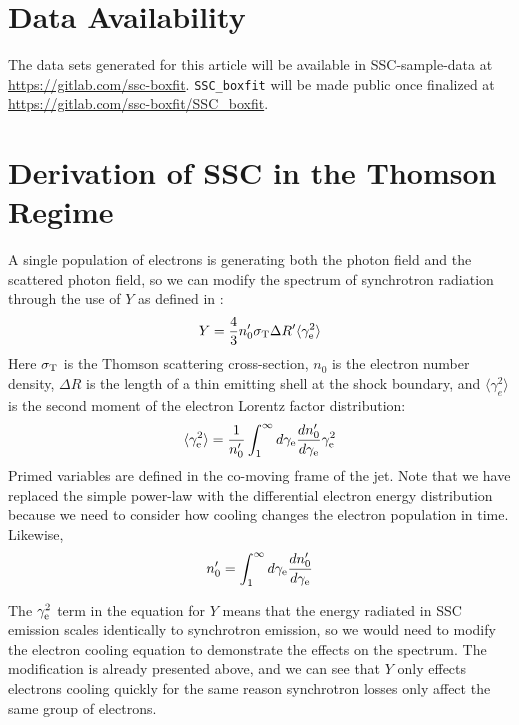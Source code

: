 \documentclass[fleqn,usenatbib]{mnras}
\begin{document}
\section*{Data Availability}

The data sets generated for this article will be available in SSC-sample-data at \url{https://gitlab.com/ssc-boxfit}. \texttt{SSC\_boxfit} will be made public once finalized at \url{https://gitlab.com/ssc-boxfit/SSC_boxfit}.



\onecolumn
\appendix

\section{Derivation of SSC in the Thomson Regime}\label{appT}

A single population of electrons is generating both the photon field and the scattered photon field, so we can modify the spectrum of synchrotron radiation through the use of $Y$ as defined in \citet{RL}:
\begin{equation}
\label{Y:gammal}
Y = \frac{4}{3}n_0^{\prime} \sigma_{\rm T} \Delta R^{\prime} \langle\gamma_{\rm e}^2\rangle
\end{equation}
Here $\sigma_{\rm T}$ is the Thomson scattering cross-section, $n_0$ is the electron number density, $\Delta R$ is the length of a thin emitting shell at the shock boundary, and $\langle \gamma_{e}^2\rangle$ is the second moment of the electron Lorentz factor distribution:
\begin{equation}
\langle\gamma_{\rm e}^2\rangle =\frac{1}{n_0^{\prime}} \int_{1}^{\infty}d\gamma_{\rm e} \frac{d n_0^{\prime}}{d\gamma_{\rm e}}\gamma_{\rm e}^2
\end{equation}
Primed variables are defined in the co-moving frame of the jet. Note that we have replaced the simple power-law with the differential electron energy distribution because we need to consider how cooling changes the electron population in time.  Likewise,
\begin{equation}
\label{n0:gen}
n_0^{\prime} = \int_{1}^{\infty}d\gamma_{\rm e}\frac{dn_0^{\prime}}{d\gamma_{\rm e}}
\end{equation}

The $\gamma_{\rm e}^2$ term in the equation for $Y$ means that the energy radiated in SSC emission scales identically to synchrotron emission, so we would need to modify the electron cooling equation to demonstrate the effects on the spectrum.  The modification is already presented above, and we can see that $Y$ only effects electrons cooling quickly for the same reason synchrotron losses only affect the same group of electrons.
\end{document}
